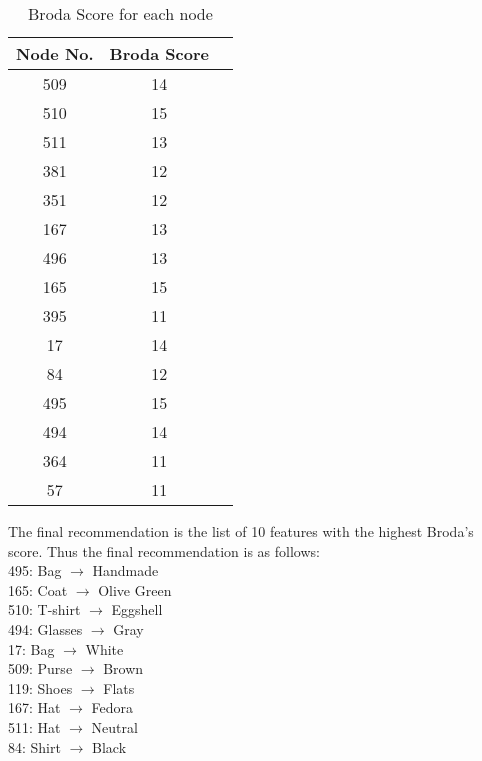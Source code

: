 \begin{table}
\centering
\caption{Broda Score for each node}
\begin{tabular}{|c|c|c|}
\hline
Node No. & Broda Score\\
\hline\hline
509 &  14 \\
510 &  15 \\
511 &  13 \\
381 &  12 \\
351 &  12 \\
167 &  13 \\
496 &  13 \\
165 &  15 \\
395 &  11 \\
17  & 14 \\
84  & 12 \\
495 &  15 \\
494 &  14 \\
364 &  11 \\
57  & 11 \\
\hline\end{tabular}
\label{table:broda}
\end{table}
The final recommendation is the list of 10 features with the highest Broda's score. Thus the final recommendation is as follows: \\
495: Bag $\rightarrow$ Handmade \\
165: Coat $\rightarrow$ Olive Green \\
510: T-shirt $\rightarrow$ Eggshell \\
494: Glasses $\rightarrow$ Gray \\
17: Bag $\rightarrow$ White \\
509: Purse $\rightarrow$ Brown \\
119: Shoes $\rightarrow$ Flats \\
167: Hat $\rightarrow$ Fedora \\
511: Hat $\rightarrow$ Neutral \\
84: Shirt $\rightarrow$ Black \\